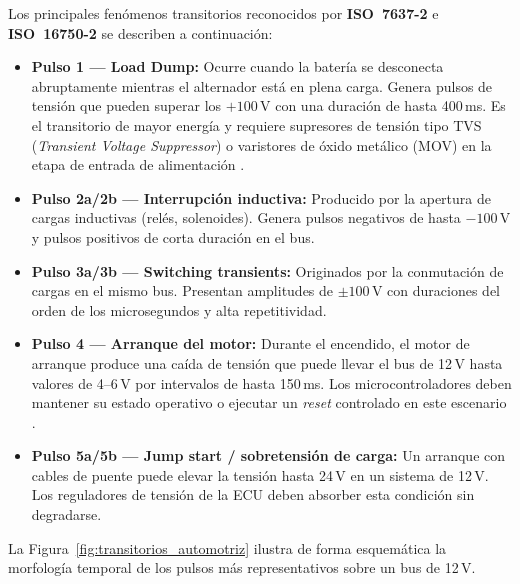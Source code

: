 Los principales fenómenos transitorios reconocidos por \textbf{ISO~7637-2} 
\citep{ISO7637} e \textbf{ISO~16750-2} se describen a continuación:

\begin{itemize}
	\item \textbf{Pulso 1 — Load Dump:} Ocurre cuando la batería se desconecta 
	abruptamente mientras el alternador está en plena carga. Genera pulsos de 
	tensión que pueden superar los $+100$\,V con una duración de hasta 400\,ms. 
	Es el transitorio de mayor energía y requiere supresores de tensión tipo TVS 
	(\textit{Transient Voltage Suppressor}) o varistores de óxido metálico (MOV) 
	en la etapa de entrada de alimentación \citep{Tarter1991}.
	
	\item \textbf{Pulso 2a/2b — Interrupción inductiva:} Producido por la apertura 
	de cargas inductivas (relés, solenoides). Genera pulsos negativos de hasta 
	$-100$\,V y pulsos positivos de corta duración en el bus.
	
	\item \textbf{Pulso 3a/3b — Switching transients:} Originados por la 
	conmutación de cargas en el mismo bus. Presentan amplitudes de $\pm100$\,V 
	con duraciones del orden de los microsegundos y alta repetitividad.
	
	\item \textbf{Pulso 4 — Arranque del motor:} Durante el encendido, el motor 
	de arranque produce una caída de tensión que puede llevar el bus de 12\,V 
	hasta valores de 4--6\,V por intervalos de hasta 150\,ms. Los 
	microcontroladores deben mantener su estado operativo o ejecutar un 
	\textit{reset} controlado en este escenario \citep{Bosch2014}.
	
	\item \textbf{Pulso 5a/5b — Jump start / sobretensión de carga:} Un arranque 
	con cables de puente puede elevar la tensión hasta 24\,V en un sistema de 
	12\,V. Los reguladores de tensión de la ECU deben absorber esta condición 
	sin degradarse.
\end{itemize}

La Figura~\ref{fig:transitorios_automotriz} ilustra de forma esquemática la 
morfología temporal de los pulsos más representativos sobre un bus de 12\,V.

